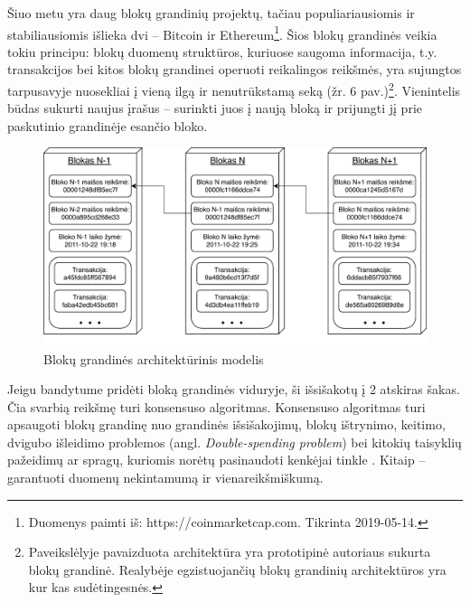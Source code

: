 Šiuo metu yra daug blokų grandinių projektų, tačiau populiariausiomis ir stabiliausiomis išlieka dvi – Bitcoin ir Ethereum\footnote{Duomenys paimti iš: https://coinmarketcap.com. Tikrinta 2019-05-14.}. Šios blokų grandinės veikia tokiu principu: blokų duomenų struktūros, kuriuose saugoma informacija, t.y. transakcijos bei kitos blokų grandinei operuoti reikalingos reikšmės, yra sujungtos tarpusavyje nuosekliai į vieną ilgą ir nenutrūkstamą seką (žr. 6 pav.)\footnote{Paveikslėlyje pavaizduota architektūra yra prototipinė autoriaus sukurta blokų grandinė. Realybėje egzistuojančių blokų grandinių architektūros yra kur kas sudėtingesnės.}. Vienintelis būdas sukurti naujus įrašus – surinkti juos į naują bloką ir prijungti jį prie paskutinio grandinėje esančio bloko.

\begin{figure}[H]
    \centering
    \includegraphics[scale=0.85]{images/block-chain-architecture}
    \caption{Blokų grandinės architektūrinis modelis}
\end{figure}





Jeigu bandytume pridėti bloką grandinės viduryje, ši išsišakotų į 2 atskiras šakas. Čia svarbią reikšmę turi konsensuso algoritmas. Konsensuso algoritmas turi apsaugoti blokų grandinę nuo grandinės išsišakojimų, blokų ištrynimo, keitimo, dvigubo išleidimo problemos (angl. \textit{Double-spending problem}) bei kitokių taisyklių pažeidimų ar spragų, kuriomis norėtų pasinaudoti kenkėjai tinkle \cite{baliga2017understanding}. Kitaip – garantuoti duomenų nekintamumą ir vienareikšmiškumą.

